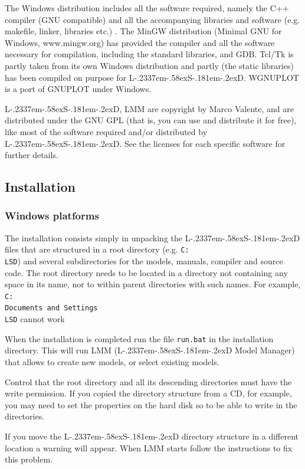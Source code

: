 \documentclass [11pt,a4paper] {book}
\def\LsD{{L\kern-.2337em\lower-.58ex\hbox{S}\kern-.181em\lower-.2ex\hbox{D}}\xspace}
\begin{document}
The Windows distribution includes all the software required, namely the C++ compiler (GNU compatible) and all the accompanying libraries and software (e.g. makefile, linker, libraries etc.) . The MinGW distribution (Minimal GNU for Windows, www.mingw.org) has provided the compiler and all the software necessary
for compilation, including the standard libraries, and GDB.  Tcl/Tk is partly taken from
its own Windows distribution and partly (the static libraries) has been compiled on
purpose for \LsD. WGNUPLOT is a port of GNUPLOT under Windows.



\LsD, LMM are copyright by Marco Valente, and are distributed under the GNU GPL (that is,
you can use and distribute it for free), like most of the software required and/or
distributed by \LsD. See the licenses for each specific software for further details.

\subsection{Installation}
\subsubsection{Windows platforms}
The installation consists simply in unpacking the \LsD files that are structured in a root directory (e.g. \texttt{C:\\LSD}) and several subdirectories for the models, manuals, compiler and source code. The root directory needs to be located in a directory not containing any space in its name, nor to within parent directories with such names. For example, \texttt{C:\\Documents and Settings\\LSD} cannot work

When the installation is completed run the file \texttt{run.bat} in the installation directory. This will run LMM (\LsD Model Manager) that allows to create new models, or select existing models.

Control that the root directory and all its descending directories must have the write permission. If you copied the directory structure from a CD, for example, you may need to set the properties on the hard disk so to be able to write in the directories.

If you move the \LsD directory structure in a different location a warning will appear. When LMM starts follow the instructions to fix this problem.
\end{document}
